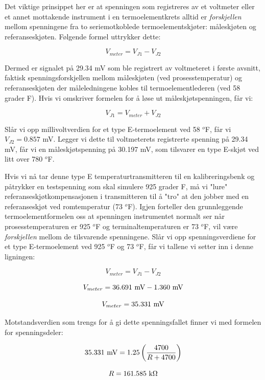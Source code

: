 





Det viktige prinsippet her er at spenningen som registreres av et voltmeter eller et annet mottakende instrument i en termoelementkrets alltid er {\it forskjellen} mellom spenningene fra to seriemotkoblede termoelementskjøter: måleskjøten og referanseskjøten. Følgende formel uttrykker dette:

$$V_{meter} = V_{J1} - V_{J2}$$

Dermed er signalet på 29.34 mV som ble registrert av voltmeteret i første avsnitt, faktisk spenningsforskjellen mellom måleskjøten (ved prosesstemperatur) og referanseskjøten der måleledningene kobles til termoelementlederen (ved 58 grader F). Hvis vi omskriver formelen for å løse ut måleskjøtspenningen, får vi:

$$V_{J1} = V_{meter} + V_{J2}$$

Slår vi opp millivoltverdien for et type E-termoelement ved 58 $^{o}$F, får vi $V_{J2} = 0.857$ mV. Legger vi dette til voltmeterets registrerte spenning på 29.34 mV, får vi en måleskjøtspenning på 30.197 mV, som tilsvarer en type E-skjøt ved litt over 780 $^{o}$F.

\vskip 50pt

Hvis vi nå tar denne type E temperaturtransmitteren til en kalibreringsbenk og påtrykker en testspenning som skal simulere 925 grader F, må vi "lure" referanseskjøtkompensasjonen i transmitteren til å "tro" at den jobber med en referanseskjøt ved romtemperatur (73 $^{o}$F). Igjen forteller den grunnleggende termoelementformelen oss at spenningen instrumentet normalt ser når prosesstemperaturen er 925 $^{o}$F og terminaltemperaturen er 73 $^{o}$F, vil være {\it forskjellen} mellom de tilsvarende spenningene. Slår vi opp spenningsverdiene for et type E-termoelement ved 925 $^{o}$F og 73 $^{o}$F, får vi tallene vi setter inn i denne ligningen:

$$V_{meter} = V_{J1} - V_{J2}$$

$$V_{meter} = 36.691 \hbox{ mV} - 1.360 \hbox{ mV}$$

$$V_{meter} = 35.331 \hbox{ mV}$$

Motstandsverdien som trengs for å gi dette spenningsfallet finner vi med formelen for spenningsdeler:

$$35.331 \hbox{ mV} = 1.25 \left( {4700 \over R + 4700} \right)$$

$$R = 161.585 \hbox{ k}\Omega$$


